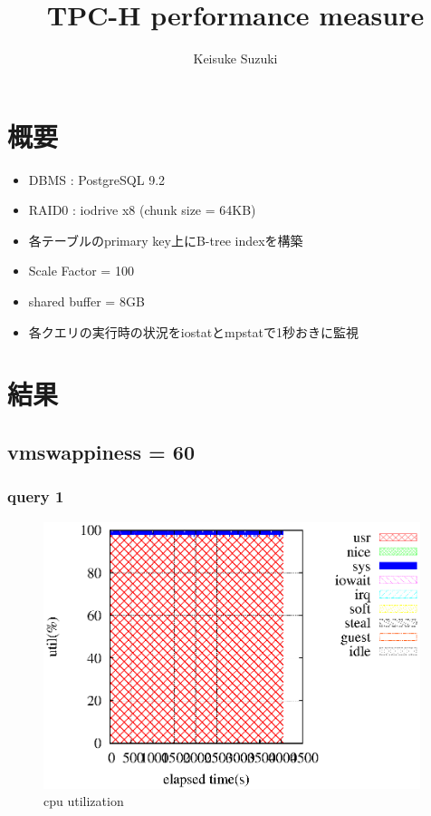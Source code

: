 \documentclass[11pt,a4paper]{jsarticle}
\title{TPC-H performance measure}
\author{Keisuke Suzuki}
\begin{document}
\maketitle
\section{概要}
\begin{itemize}
 \item DBMS : PostgreSQL 9.2
 \item RAID0 : iodrive x8 (chunk size = 64KB)
 \item 各テーブルのprimary key上にB-tree indexを構築
 \item Scale Factor = 100
 \item shared buffer = 8GB
 \item 各クエリの実行時の状況をiostatとmpstatで1秒おきに監視
\end{itemize}

\section{結果}

\subsection*{vmswappiness = 60}
\clearpage
\subsubsection*{query 1}
\begin{figure}[thbp]
 \begin{center}
  \includegraphics[width=110mm]{1core1.eps}
 \end{center}
 \caption{cpu utilization}
 \label{fig:1cpu}
\end{figure}
\end{document}
